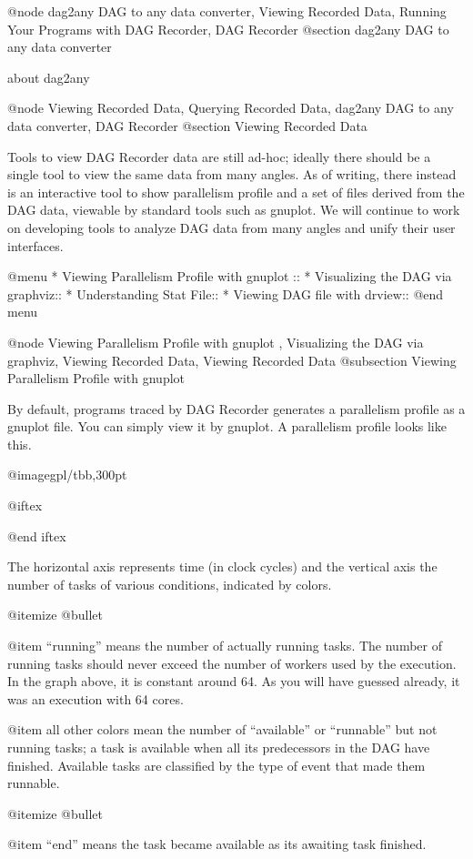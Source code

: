 @node dag2any DAG to any data converter, Viewing Recorded Data, Running Your Programs with DAG Recorder, DAG Recorder
@section dag2any DAG to any data converter

about dag2any

@node Viewing Recorded Data, Querying Recorded Data, dag2any DAG to any data converter, DAG Recorder
@section Viewing Recorded Data

Tools to view DAG Recorder data are still ad-hoc; ideally there should
be a single tool to view the same data from many angles.  As of writing,
there instead is an interactive tool to show parallelism profile and a
set of files derived from the DAG data, viewable by standard tools such as
gnuplot.  We will continue to work on developing tools to analyze DAG
data from many angles and unify their user interfaces.

@menu
* Viewing Parallelism Profile with gnuplot ::
* Visualizing the DAG via graphviz::
* Understanding Stat File::
* Viewing DAG file with drview::
@end menu

@node Viewing Parallelism Profile with gnuplot , Visualizing the DAG via graphviz, Viewing Recorded Data, Viewing Recorded Data
@subsection Viewing Parallelism Profile with gnuplot 

By default, programs traced by DAG Recorder generates a parallelism profile as a gnuplot file.  You can simply view it by gnuplot.  A parallelism profile looks like this.

@image{gpl/tbb,300pt}

@iftex


@end iftex

The horizontal axis represents time (in clock cycles) and the vertical
axis the number of tasks of various conditions, indicated by colors.

@itemize @bullet

@item ``running'' means the number of actually running tasks.
The number of running tasks should never exceed the number of workers used
by the execution.  In the graph above, it is constant around 64.  As you
will have guessed already, it was an execution with 64 cores.

@item all other colors mean the number of ``available'' or 
``runnable'' but not running tasks; a task is available when all its
predecessors in the DAG have finished.  Available tasks are classified
by the type of event that made them runnable.  

@itemize @bullet

@item ``end'' means the task became available as its awaiting task finished.

